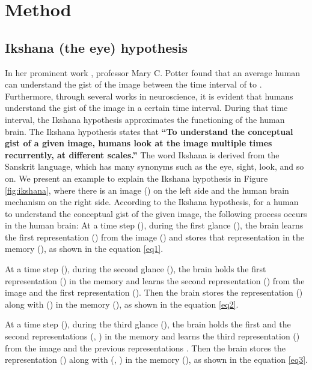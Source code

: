 \documentclass{article}
\begin{document}
\section{Method}
\label{method}
\subsection{Ikshana (the eye) hypothesis}
\label{3.1}
In her prominent work \cite{potter1975meaning}, professor Mary C. Potter found that an average human can understand the gist of the image between the time interval of  to  . Furthermore, through several works \cite{intraub1981rapid,rayner1998eye,schyns1994blobs,oliva2000diagnostic,oliva2001modeling,henderson2003human,evans2005perception,fei2007we} in neuroscience, it is evident that humans understand the gist of the image in a certain time interval. During that time interval, the Ikshana hypothesis approximates the functioning of the human brain.
The Ikshana hypothesis states that \textbf{``To  understand the conceptual gist of a given image, humans look at the image multiple times recurrently, at different scales.''} The word Ikshana is derived from the Sanskrit language, which has many synonyms such as the eye, sight, look, and so on. \newline
We present an example to explain the Ikshana hypothesis in Figure \ref{fig:ikshana}, where there is an image () on the left side and the human brain mechanism on the right side.
According to the Ikshana hypothesis, for a human to understand the conceptual gist of the given image, the following process occurs in the human brain: \newline
At a time step (), during the first glance (), the brain learns the first representation () from the image () and stores that representation in the memory (), as shown in the equation \ref{eq1}.

At a time step (), during the second glance (), the brain holds the first representation () in the memory and learns the second representation () from the image and the first representation (). Then the brain stores the representation () along with () in the memory (), as shown in the equation \ref{eq2}.

At a time step (), during the third glance (), the brain holds the first and the second representations (, ) in the memory and learns the third representation () from the image and the previous representations . Then the brain stores the representation () along with (, ) in the memory (), as shown in the equation \ref{eq3}.  
\end{document}
